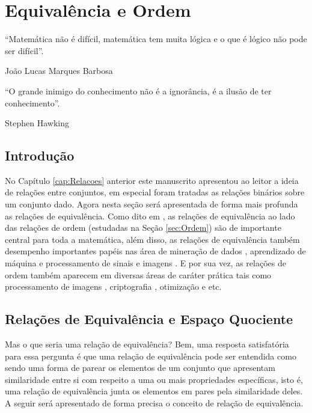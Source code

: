 \chapter{Equivalência e Ordem}\label{cap:EquivalenciaOrdem}

\epigraph{``Matemática não é difícil, matemática tem muita lógica e o que é lógico não pode ser difícil''.}{João Lucas Marques Barbosa}

\epigraph{``O grande inimigo do conhecimento não é a ignorância, é a ilusão de ter conhecimento''.}{Stephen Hawking}


\section{Introdução}\label{sec:IntroEquivalenciaOrdem}

No Capítulo \ref{cap:Relacoes} anterior este manuscrito apresentou ao leitor a ideia de relações entre conjuntos, em especial foram tratadas as relações binários sobre um conjunto dado. Agora nesta seção será apresentada de forma mais profunda as relações de equivalência. Como dito em \cite{abe1991-TC, carmo2013}, as relações de equivalência ao lado das relações de ordem (estudadas na Seção \ref{sec:Ordem}) são de importante central para toda a matemática, além disso, as relações de equivalência também desempenho importantes papéis nas área de mineração de dados \cite{lin1999data, lingras1998data}, aprendizado de máquina \cite{bar2003learning} e processamento de sinais \cite{li2007equivalent} e imagens \cite{acharya2003classification, myasnikov2018description}. E por sua vez, as relações de ordem também aparecem em diversas áreas de caráter prática tais como processamento de imagens \cite{farias2016image, cressie1998image}, criptografia \cite{giri2008crypto}, otimização \cite{karaman2018partial} e etc.

\section{Relações de Equivalência e Espaço Quociente}\label{sec:Equivalencia}

Mas o que seria uma relação de equivalência? Bem, uma resposta satisfatória para essa pergunta é que uma relação de equivalência pode ser entendida como sendo uma forma de parear os elementos de um conjunto que apresentam similaridade entre si com respeito a uma ou mais propriedades específicas, isto é, uma relação de equivalência junta os elementos em pares pela similaridade deles. A seguir será apresentado de forma precisa o conceito de relação de equivalência.


